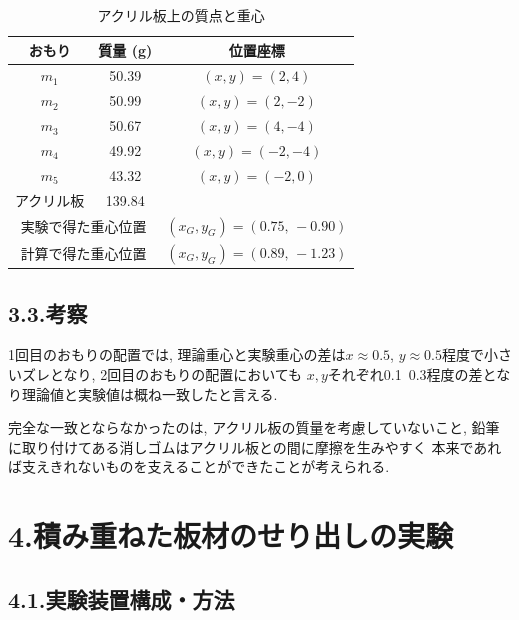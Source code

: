 \documentclass{jlreq}
\begin{document}
\begin{table}[htbp]
  \centering
  \caption{アクリル板上の質点と重心}
  \begin{tabular}{|c|c|c|}
    \hline
    おもり & 質量 (g) & 位置座標 \\
    \hline
    $m_1$ & 50.39 & $(x,y) = (2,4)$ \\
    \hline
    $m_2$ & 50.99 & $(x,y) = (2,-2)$ \\
    \hline
    $m_3$ & 50.67 & $(x,y) = (4,-4)$ \\
    \hline
    $m_4$ & 49.92 & $(x,y) = (-2,-4)$ \\
    \hline
    $m_5$ & 43.32 & $(x,y) = (-2,0)$ \\
    \hline
    アクリル板 & 139.84 &  \\ %
    \hline
    \multicolumn{2}{|c|}{実験で得た重心位置} &
      $(x_G,y_G) = (0.75,\,-0.90)$ \\
    \hline
    \multicolumn{2}{|c|}{計算で得た重心位置} &
      $(x_G,y_G) = (0.89,\,-1.23)$ \\
    \hline
  \end{tabular}
  \label{tab:acrylic_cg}
\end{table}




\subsection*{3.3.考察}

1回目のおもりの配置では, 理論重心と実験重心の差は$x \approx 0.5$,
$y \approx 0.5$程度で小さいズレとなり, 2回目のおもりの配置においても
$x,y$それぞれ0.1~0.3程度の差となり理論値と実験値は概ね一致したと言える.\par

完全な一致とならなかったのは, アクリル板の質量を考慮していないこと, 
鉛筆に取り付けてある消しゴムはアクリル板との間に摩擦を生みやすく
本来であれば支えきれないものを支えることができたことが考えられる. 







\section*{4.積み重ねた板材のせり出しの実験}

\subsection*{4.1.実験装置構成・方法}
\end{document}
